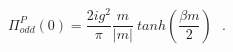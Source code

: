 \begin{equation}
\Pi_{odd}^{P}(0) = \frac {2ig^2}{\pi}
\frac{m}{|m|} ~tanh(\frac {\beta m}{2}) ~~~. 
\end{equation}

